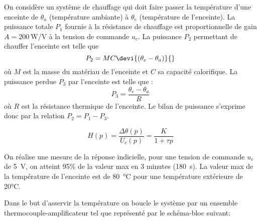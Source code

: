 On considère un système de chauffage qui doit faire passer la température 
d'une enceinte de $\theta_a$  (température ambiante) à $\theta_e$ (température 
de l'enceinte). 
La puissance totale $P_1$ fournie à la résistance de chauffage 
est proportionnelle de gain $A=\SI{200}{\watt\per\volt}$ à la tension de 
commande $u_c$. 
La puissance $P_2$ permettant de chauffer l'enceinte est telle que 
\[
    P_2=MC\devi{(\theta_e-\theta_a)}{}
\]
où $M$ est la masse du matériau de l'enceinte et $C$ sa capacité calorifique.
La puissance perdue $P_3$ par l'enceinte est telle que :
\[
    P_3=\dfrac{\theta_e-\theta_a}{R}
\]
où $R$ est la résistance thermique de l'enceinte.
Le bilan de puissance s'exprime donc par la relation $P_2=P_1-P_3$.


\[
    H(p)=\dfrac{\Delta\theta(p)}{U_c(p)}=\dfrac{K}{1+\tau p}
\]

On réalise une mesure de la réponse indicielle, pour une tension de commande 
$u_c$ de \SI{5}{\volt}, on atteint 95\% de la valeur max en 3 minutes 
(\SI{180}{\second}). La valeur max de la température de l'enceinte est de 
\SI{80}{\celsius} pour une température extérieure de 20°C.

Dans le but d'asservir la température on boucle le système par un ensemble 
thermocouple-amplificateur tel que représenté par le schéma-bloc suivant:

